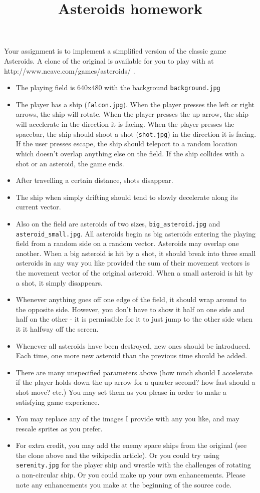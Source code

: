 \documentclass{article}
\title{Asteroids homework}
\begin{document}
\maketitle

Your assignment is to implement a simplified version of the classic game Asteroids.  A clone of the original is available for you to play with at http://www.neave.com/games/asteroids/ . 
\begin{itemize}
\item The playing field is 640x480 with the background \texttt{background.jpg}
\item
The player has a ship (\texttt{falcon.jpg}).  When the player presses the left or right arrows, the ship will rotate.  When the player presses the up arrow, the ship will accelerate in the direction it is facing. When the player presses the spacebar, the ship should shoot a shot (\texttt{shot.jpg}) in the direction it is facing.  If the user presses escape, the ship should teleport to a random location which doesn't overlap anything else on the field. If the ship collides with a shot or an asteroid, the game ends.
\item
After travelling a certain distance, shots disappear.
\item
The ship when simply drifting should tend to slowly decelerate along its current vector.
\item
Also on the field are asteroids of two sizes, \texttt{big\_asteroid.jpg} and \texttt{asteroid\_small.jpg}.  All asteroids begin as big asteroids entering the playing field from a random side on a random vector.  Asteroids may overlap one another.  When a big asteroid is hit by a shot, it should break into three small asteroids in any way you like provided the sum of their movement vectors is the movement vector of the original asteroid.  When a small asteroid is hit by a shot, it simply disappears.
\item
Whenever anything goes off one edge of the field, it should wrap around to the opposite side.  However, you don't have to show it half on one side and half on the other - it is permissible for it to just jump to the other side when it it halfway off the screen.
\item Whenever all asteroids have been destroyed, new ones should be introduced.  Each time, one more new asteroid than the previous time should be added.
\item There are many unspecified parameters above (how much should I accelerate if the player holds down the up arrow for a quarter second?  how fast should a shot move? etc.) You may set them as you please in order to make a satisfying game experience. 
\item You may replace any of the images I provide with any you like, and may rescale sprites as you prefer.
\item For extra credit, you may add the enemy space ships from the original (see the clone above and the wikipedia article). Or you could try using \texttt{serenity.jpg} for the player ship and wrestle with the challenges of rotating a non-circular ship. Or you could make up your own enhancements.  Please note any enhancements you make at the beginning of the source code.
\end{itemize}
\end{document}

